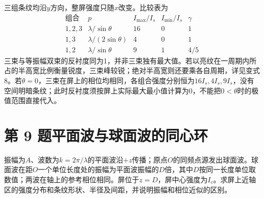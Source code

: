 \documentclass[UTF8,fontset=fandol,a4paper,11pt]{ctexart}
\begin{document}
三组条纹均沿$y$方向，整屏强度只随$x$改变。比较表为
\[
\begin{array}{c|c|c|c|c}
\text{组合}&p&I_{\max}/I_s&I_{\min}/I_s&\gamma\\\hline
1,2,3&\lambda/\sin\theta&16&0&1\\
1,3&\lambda/(2\sin\theta)&4&0&1\\
1,2&\lambda/\sin\theta&9&1&4/5
\end{array}
\]
三束与等振幅双束的反衬度同为1，并非三束独有最大值。若以亮纹在一周期内所占的半高宽比例衡量锐度，三束峰较锐；绝对半高宽则还要乘各自周期，详见变式8。若$\theta=0$，三束在屏上的相位均相同，各组合强度分别恒为$16I_s,4I_s,9I_s$，没有空间明暗条纹；此时反衬度须按屏上实际最大最小值计算为0，不能把$0<\theta$时的极值范围直接代入。




\section*{第 9 题\quad 平面波与球面波的同心环}\label{q:9}

振幅为$A$、波数为$k=2\pi/\lambda$的平面波沿$+z$传播；原点$O$的同频点源发出球面波。球面波在距$O$一个单位长度处的振幅为平面波振幅的$D$倍，其中$D$按同一长度单位取数值；两波在轴上的参考相位相同。屏位于$z=D$，屏中心强度为$I_c$。求屏上近轴区的强度分布和条纹形状、半径及间距，并说明振幅和相位近似的区别。
\end{document}
